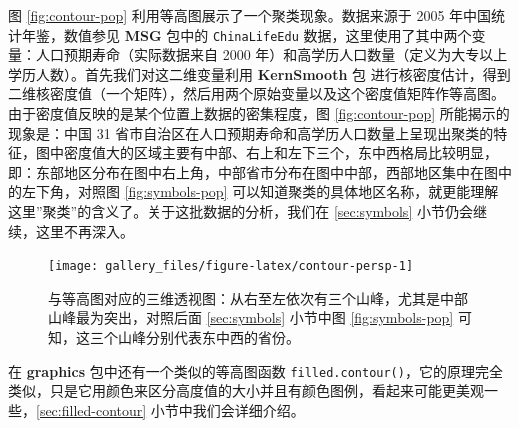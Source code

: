 \documentclass[
  b5paper,
  UTF8,twoside]{book}
\newenvironment{Shaded}{\begin{snugshade}}{\end{snugshade}}
\newcommand{\AttributeTok}[1]{\textcolor[rgb]{0.13,0.29,0.53}{#1}}
\newcommand{\CommentTok}[1]{\textcolor[rgb]{0.56,0.35,0.01}{\textit{#1}}}
\newcommand{\ConstantTok}[1]{\textcolor[rgb]{0.56,0.35,0.01}{#1}}
\newcommand{\DecValTok}[1]{\textcolor[rgb]{0.00,0.00,0.81}{#1}}
\newcommand{\FloatTok}[1]{\textcolor[rgb]{0.00,0.00,0.81}{#1}}
\newcommand{\FunctionTok}[1]{\textcolor[rgb]{0.13,0.29,0.53}{\textbf{#1}}}
\newcommand{\NormalTok}[1]{#1}
\newcommand{\SpecialCharTok}[1]{\textcolor[rgb]{0.81,0.36,0.00}{\textbf{#1}}}
\newcommand{\StringTok}[1]{\textcolor[rgb]{0.31,0.60,0.02}{#1}}
\begin{document}
图 \ref{fig:contour-pop}
利用等高图展示了一个聚类现象。数据来源于 2005 年中国统计年鉴，数值参见 \textbf{MSG} 包中的 \texttt{ChinaLifeEdu} 数据，这里使用了其中两个变量：人口预期寿命（实际数据来自 2000 年）和高学历人口数量（定义为大专以上学历人数）。首先我们对这二维变量利用 \textbf{KernSmooth} 包 \citep{KernSmooth} 进行核密度估计，得到二维核密度值（一个矩阵），然后用两个原始变量以及这个密度值矩阵作等高图。由于密度值反映的是某个位置上数据的密集程度，图 \ref{fig:contour-pop} 所能揭示的现象是：中国 31 省市自治区在人口预期寿命和高学历人口数量上呈现出聚类的特征，图中密度值大的区域主要有中部、右上和左下三个，东中西格局比较明显，即：东部地区分布在图中右上角，中部省市分布在图中中部，西部地区集中在图中的左下角，对照图 \ref{fig:symbols-pop} 可以知道聚类的具体地区名称，就更能理解这里''聚类''的含义了。关于这批数据的分析，我们在 \ref{sec:symbols} 小节仍会继续，这里不再深入。





\begin{Shaded}
\end{Shaded}

\begin{figure}

{\centering \texttt{[image: gallery\_files/figure-latex/contour-persp-1]} 

}

\caption[与等高图对应的三维透视图]{与等高图对应的三维透视图：从右至左依次有三个山峰，尤其是中部山峰最为突出，对照后面 \ref{sec:symbols} 小节中图 \ref{fig:symbols-pop} 可知，这三个山峰分别代表东中西的省份。}\label{fig:contour-persp}
\end{figure}

在 \textbf{graphics} 包中还有一个类似的等高图函数 \texttt{filled.contour()}，它的原理完全类似，只是它用颜色来区分高度值的大小并且有颜色图例，看起来可能更美观一些，\ref{sec:filled-contour} 小节中我们会详细介绍。
\end{document}
